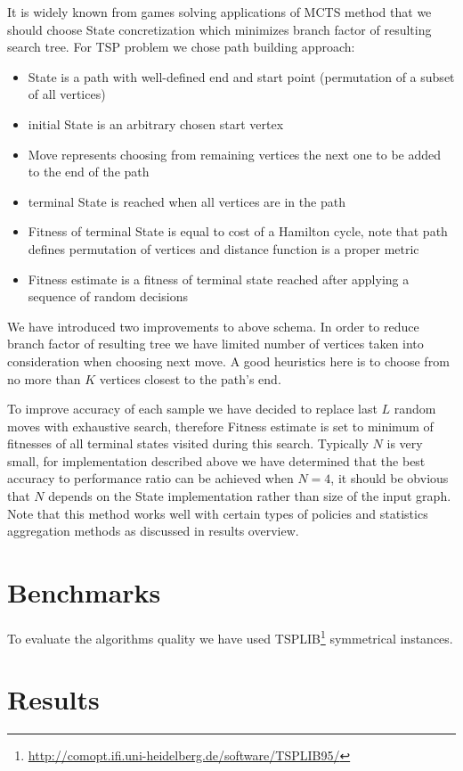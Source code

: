 It is widely known from games solving applications of MCTS method that we
should choose State concretization which minimizes branch factor of resulting
search tree. For TSP problem we chose path building approach:
\begin{itemize}
  \item State is a path with well-defined end and start point (permutation of a
    subset of all vertices)
  \item initial State is an arbitrary chosen start vertex
  \item Move represents choosing from remaining vertices the next one to be
    added to the end of the path
  \item terminal State is reached when all vertices are in the path
  \item Fitness of terminal State is equal to cost of a Hamilton cycle, note
    that path defines permutation of vertices and distance function is a proper
    metric
  \item Fitness estimate is a fitness of terminal state reached after applying
    a sequence of random decisions
\end{itemize}

We have introduced two improvements to above schema. In order to reduce branch
factor of resulting tree we have limited number of vertices taken into
consideration when choosing next move. A good heuristics here is to choose from
no more than $K$ vertices closest to the path's end.

To improve accuracy of each sample we have decided to replace last $L$ random
moves with exhaustive search, therefore Fitness estimate is set to minimum of
fitnesses of all terminal states visited during this search. Typically $N$ is
very small, for implementation described above we have determined that the best
accuracy to performance ratio can be achieved when $N = 4$, it should be
obvious that $N$ depends on the State implementation rather than size of the
input graph. Note that this method works well with certain types of policies
and statistics aggregation methods as discussed in results overview.

\section{Benchmarks}
To evaluate the algorithms quality we have used
TSPLIB\footnote{\url{http://comopt.ifi.uni-heidelberg.de/software/TSPLIB95/}}
symmetrical instances.

\section{Results}

